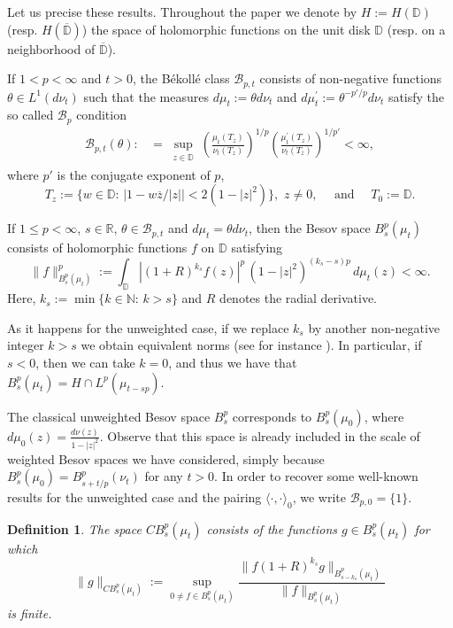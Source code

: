 \documentclass[12pt,twoside,leqno,final]{amsart}
\theoremstyle{plain}
\newtheorem{defn}[thm]{Definition}
\begin{document}
Let us precise these results. 
Throughout the paper we denote by $H:=H({{\mathbb D}})$ (resp. $H(\overline {{\mathbb D}})$) the space of holomorphic functions on the unit disk 
${{\mathbb D}}$ (resp. on a neighborhood of $\overline{{\mathbb D}}$). 

 
If $1<p<\infty$ and $t>0$, the B\'ekoll\'e class ${{\mathcal B}}_{p,t}$ consists of non-negative functions $\theta\in L^1(d\nu_t)$
such that the measures $d\mu_t:=\theta d\nu_t$  and $ d\mu^\prime_t:=\theta^{-p'/p}d\nu_t$ satisfy the so called ${{\mathcal B}}_p$ condition
\begin{align*}
{{\mathcal B}}_{p,t}(\theta):&=\sup_{\substack{z\in {{\mathbb D}}}}
\left(\frac{\mu_t(T_z)}{\nu_t(T_z)}\right)^{1/p}
\left(\frac{\mu^\prime_t(T_z)}{\nu_t(T_z)}\right)^{1/p'}<\infty,
\end{align*}
where $p'$ is the conjugate exponent of $p$, 
$$
T_z:=\{w\in{{\mathbb D}}:\,|1-w\overline z/|z||<2(1-|z|^2)\},\,\, z\ne 0,\quad \text{   and }\quad T_0:={{\mathbb D}}.
$$

 
If $1\le p<\infty$, $s\in{{\mathbb R}}$, $\theta\in {{\mathcal B}}_{p,t}$ and $d\mu_t=\theta d\nu_t$, then the  Besov space $B^p_s(\mu_t)$ 
consists of holomorphic functions $f$ on ${{\mathbb D}}$ satisfying 
$$
\|f\|_{B^p_s(\mu_t)}^p:=\int_{{\mathbb D}} \left|(1+R)^{k_s} f(z)\right|^p\,(1-|z|^2)^{(k_s-s)p}\,d\mu_t(z)<\infty.
$$
Here, $k_s:=\min\{k\in {{\mathbb N}}:\,k>s\}$ and $R$ denotes the radial derivative. 

 As it happens for the unweighted case, if we replace $k_s$ by another non-negative 
 integer $k>s$ we obtain 
equivalent norms  (see for instance \cite[Section 3]{Ca-Or1}). In particular, 
if $s<0$, then we can take $k=0$, and thus we have that
$B^p_{s}(\mu_t)=H\cap L^p(\mu_{t-sp})$.

The classical unweighted Besov space $B^p_s$ corresponds to $B^p_s(\mu_0)$, 
where $d\mu_0(z)=\frac{d\nu(z)}{1-|z|^2}$.  
Observe that this space is already included in the scale of weighted Besov spaces we have considered, simply because 
 $B^p_s(\mu_0)=B^p_{s+t/p}(\nu_t)$ for any  $t>0$. 
In order to recover some well-known results for the unweighted case and the pairing
 $\langle\cdot,\cdot\rangle_0$, we write ${{\mathcal B}}_{p,0}=\{1\}$.

\begin{defn}
The space $CB^p_s(\mu_t)$ consists of the functions $g\in B^p_s(\mu_t)$ for which 
$$
\|g\|_{CB^p_s(\mu_t)}:=\sup_{0\ne f \in B^p_s(\mu_t)} 
\frac{\|f(1+R)^{k_s}g\|_{B^p_{s-k_s}(\mu_t)}}{\|f\|_{B^p_{s}(\mu_t)}}
$$
is finite.
\end{defn}
\end{document}
